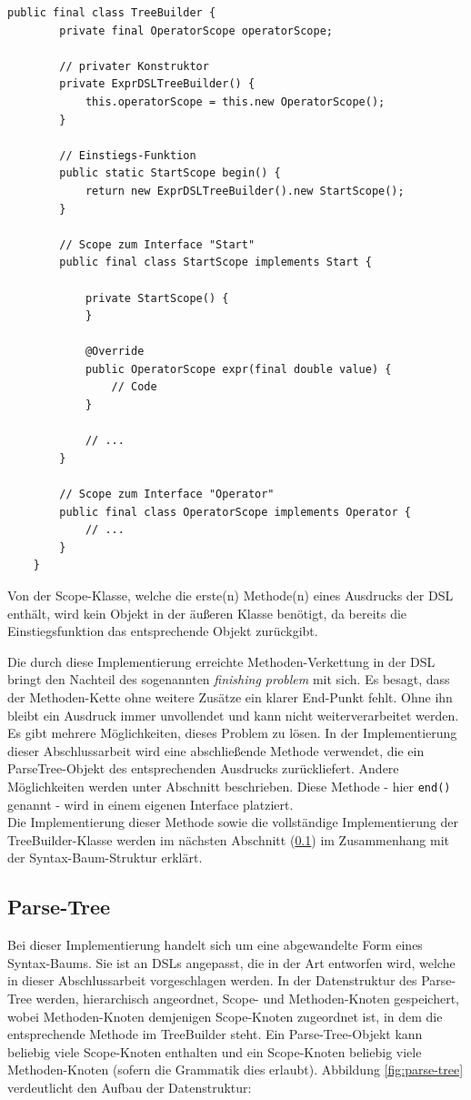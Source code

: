 \begin{lstlisting}[caption={Code für eine Builder-Klasse mit inneren Scope-Klassen},label=lst:treebuilder1]
	public final class TreeBuilder {
		private final OperatorScope operatorScope;
		
		// privater Konstruktor
		private ExprDSLTreeBuilder() {
			this.operatorScope = this.new OperatorScope();
		}
		
		// Einstiegs-Funktion
		public static StartScope begin() {
			return new ExprDSLTreeBuilder().new StartScope();
		}
		
		// Scope zum Interface "Start"
		public final class StartScope implements Start {
	
			private StartScope() {
			}
	
			@Override
			public OperatorScope expr(final double value) {
				// Code	
			}
			
			// ...
		}
		
		// Scope zum Interface "Operator"
		public final class OperatorScope implements Operator {
			// ...
		}
	}
\end{lstlisting}

Von der Scope-Klasse, welche die erste(n) Methode(n) eines Ausdrucks der DSL enthält, wird kein Objekt in der äußeren Klasse benötigt, da bereits die Einstiegsfunktion das entsprechende Objekt zurückgibt.

Die durch diese Implementierung erreichte Methoden-Verkettung in der DSL bringt den Nachteil des sogenannten \emph{finishing problem} \cite{book:fowlerDSL} mit sich. Es besagt, dass der Methoden-Kette ohne weitere Zusätze ein klarer End-Punkt fehlt. Ohne ihn bleibt ein Ausdruck immer unvollendet und kann nicht weiterverarbeitet werden. Es gibt mehrere Möglichkeiten, dieses Problem zu lösen. In der Implementierung dieser Abschlussarbeit wird eine abschließende Methode verwendet, die ein ParseTree-Objekt des entsprechenden Ausdrucks zurückliefert. Andere Möglichkeiten werden unter Abschnitt beschrieben. Diese Methode - hier \texttt{end()} genannt - wird in einem eigenen Interface platziert.\\
Die Implementierung dieser Methode sowie die vollständige Implementierung der TreeBuilder-Klasse werden im nächsten Abschnitt (\ref{ssct:4.3.3:parsetree}) im Zusammenhang mit der Syntax-Baum-Struktur erklärt.

\subsection{Parse-Tree}\label{ssct:4.3.3:parsetree}
Bei dieser Implementierung handelt sich um eine abgewandelte Form eines Syntax-Baums. Sie ist an DSLs angepasst, die in der Art entworfen wird, welche in dieser Abschlussarbeit vorgeschlagen werden. In der Datenstruktur des Parse-Tree werden, hierarchisch angeordnet, Scope- und Methoden-Knoten gespeichert, wobei Methoden-Knoten demjenigen Scope-Knoten zugeordnet ist, in dem die entsprechende Methode im TreeBuilder steht. Ein Parse-Tree-Objekt kann beliebig viele Scope-Knoten enthalten und ein Scope-Knoten beliebig viele Methoden-Knoten (sofern die Grammatik dies erlaubt). Abbildung \ref{fig:parse-tree} verdeutlicht den Aufbau der Datenstruktur:

